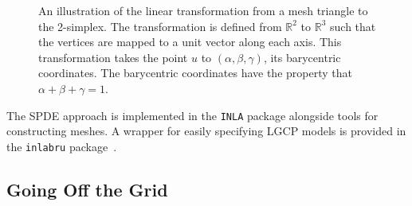 \documentclass[]{interact}
\begin{document}
\begin{figure}[t]\centering

\hspace{2em}

\caption{An illustration of the linear transformation from a mesh triangle to
the 2-simplex. The transformation is defined from \(\mathbb{R}^{2}\) to
\(\mathbb{R}^{3}\) such that the vertices are mapped to a unit vector along
each axis. This transformation takes the point \(u\) to
\((\alpha, \beta, \gamma)\), its barycentric coordinates. The barycentric
coordinates have the property that \(\alpha + \beta + \gamma = 1\).}
\label{triangle}
\end{figure}

The SPDE approach is implemented in the \texttt{INLA} package alongside tools
for constructing meshes. A wrapper for easily specifying LGCP models is
provided in the \texttt{inlabru} package~\cite{inlabru}.


\subsection{Going Off the Grid}
\label{offgrid}
\end{document}
